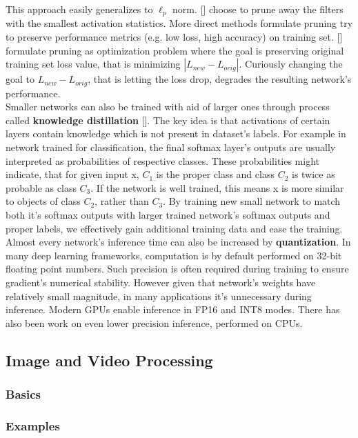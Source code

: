 \documentclass[../Main.tex]{subfiles}
\begin{document}
    This approach easily generalizes to $\ell_p$ norm.
    [\cite{polyak2015}] choose to prune away the filters with
    the smallest activation statistics. More direct methods formulate pruning 
    try to preserve performance metrics (e.g. low loss, high accuracy) on training set. 
    [\cite{molchanov2016pruning}] formulate pruning as optimization problem where
    the goal is preserving original training set loss value, that is minimizing
    $|L_{new} - L_{orig}|$. Curiously changing the goal to $L_{new} - L_{orig}$,
    that is letting the loss drop, degrades the resulting network's performance.\\
    Smaller networks can also be trained with aid of larger ones through process called
    \textbf{knowledge distillation} [\cite{hinton2015distilling}]. 
    The key idea is that activations of certain layers
    contain knowledge which is not present in dataset's labels. For example in network 
    trained for classification, the final softmax layer's outputs are usually 
    interpreted as probabilities of respective classes. These probabilities might indicate,
    that for given input x, $C_1$ is the proper class and class $C_2$ is twice as probable 
    as class $C_3$. If the network is well trained, this means x is more similar to
    objects of class $C_2$, rather than $C_3$. By training new small network to match both
    it's softmax outputs with larger trained network's softmax outputs and proper labels,
    we effectively gain additional training data and ease the training.
    Almost every network's inference time can also be increased by \textbf{quantization}.
    In many deep learning frameworks, computation is by default performed on
    32-bit floating point numbers. Such precision is often required during training to 
    ensure gradient's numerical stability. However given that network's weights have
    relatively small magnitude, in many applications it's unnecessary during inference.
    Modern GPUs enable inference in FP16 and INT8 modes. There has also been work 
    on even lower precision inference, performed on CPUs. 
    
    

\subsection{Image and Video Processing}
    \subsubsection{Basics}
    \subsubsection{Examples}


\biblio %
\end{document}

